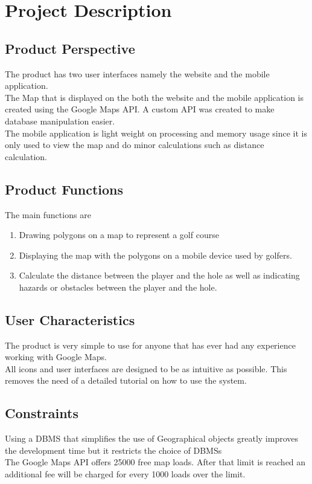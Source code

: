 \documentclass[12]{article}
\begin{document}
\section{Project Description} 
\subsection{Product Perspective}
The product has two user interfaces namely the website and the mobile application.\\
The Map that is displayed on the both the website and the mobile application is created using the Google Maps API. A custom API was created to make database manipulation easier.\\
The mobile application is light weight on processing and memory usage since it is only used to view the map and do minor calculations such as distance calculation.

\subsection{Product Functions}
The main functions are
\begin{enumerate}
	\item
	Drawing polygons on a map to represent a golf course
	\item
	Displaying the map with the polygons on a mobile device used by golfers.
	\item
	Calculate the distance between the player and the hole as well as indicating hazards or  obstacles between the player and the hole.
\end{enumerate}

\subsection{User Characteristics}
The product is very simple to use for anyone that has ever had any experience working with Google Maps.\\
All icons and user interfaces are designed to be as intuitive as possible. This removes the need of a detailed tutorial on how to use the system.

\subsection{Constraints}
Using a DBMS that simplifies the use of Geographical objects greatly improves the development time but it restricts the choice of DBMSs\\
The Google Maps API offers 25000 free map loads. After that limit is reached an additional fee will be charged for every 1000 loads over the limit.
\end{document}
